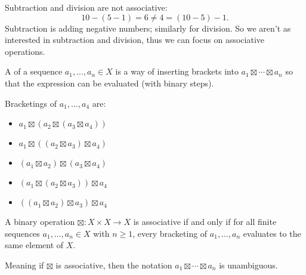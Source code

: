 \documentclass[12pt,letterpaper]{report}
\begin{document}
Subtraction and division are not associative:
\[
  10 - (5 - 1) = 6 \neq 4 = (10 - 5) - 1.
\]
Subtraction is adding negative numbers; similarly for division.
So we aren't as interested in subtraction and division, thus we can focus on associative operations.

A  of a sequence $a_1, \ldots, a_n \in X$ is a way of inserting brackets into
$a_1 \boxtimes \cdots \boxtimes a_n$ so that the expression can be evaluated (with binary steps).

\begin{ex}
  Bracketings of $a_1, \ldots, a_4$ are:
  \begin{itemize}
    \item $a_1 \boxtimes (a_2 \boxtimes (a_3 \boxtimes a_4))$
    \item $a_1 \boxtimes ((a_2 \boxtimes a_3) \boxtimes a_4)$
    \item $(a_1 \boxtimes a_2) \boxtimes (a_3 \boxtimes a_4)$
    \item $(a_1 \boxtimes (a_2 \boxtimes a_3)) \boxtimes a_4$
    \item $((a_1 \boxtimes a_2) \boxtimes a_3) \boxtimes a_4$
  \end{itemize}
\end{ex}

\begin{prop}{}{}
  A binary operation $\boxtimes \colon X \times X \to X$ is associative if and only if for all
  finite sequences $a_1, \ldots, a_n \in X$ with $n \geq 1$, every bracketing of $a_1, \ldots, a_n$
  evaluates to the same element of $X$.
\end{prop}

Meaning if $\boxtimes$ is associative, then the notation $a_1 \boxtimes \cdots \boxtimes a_n$ is
unambiguous.
\end{document}
